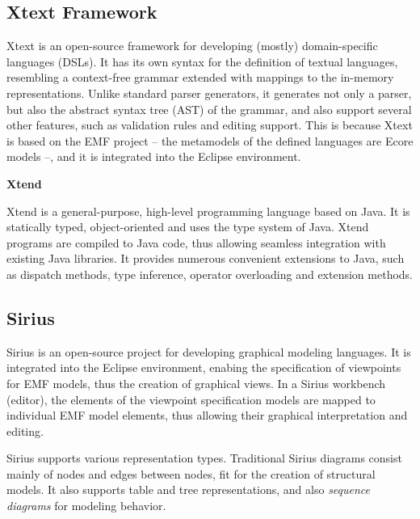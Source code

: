 \subsection{Xtext Framework} \label{subsec_xtext}
Xtext is an open-source framework for developing (mostly) domain-specific languages (DSLs). It has its own syntax for the definition of textual languages, resembling a context-free grammar extended with mappings to the in-memory representations. Unlike standard parser generators, it generates not only a parser, but also the abstract syntax tree (AST) of the grammar, and also support several other features, such as validation rules and editing support. This is because Xtext is based on the EMF project -- the metamodels of the defined languages are Ecore models --, and it is integrated into the Eclipse environment.

\textbf{Xtend}

Xtend is a general-purpose, high-level programming language based on Java. It is statically typed, object-oriented and uses the type system of Java. Xtend programs are compiled to Java code, thus allowing seamless integration with existing Java libraries. It provides numerous convenient extensions to Java, such as dispatch methods, type inference, operator overloading and extension methods.


\subsection{Sirius} \label{subsec_sirius}
Sirius is an open-source project for developing graphical modeling languages. It is integrated into the Eclipse environment, enabing the specification of viewpoints for EMF models, thus the creation of graphical views. In a Sirius workbench (editor), the elements of the viewpoint specification models are mapped to individual EMF model elements, thus allowing their graphical interpretation and editing.

Sirius supports various representation types. Traditional Sirius diagrams consist mainly of nodes and edges between nodes, fit for the creation of structural models. It also supports table and tree representations, and also \textit{sequence diagrams} for modeling behavior.

